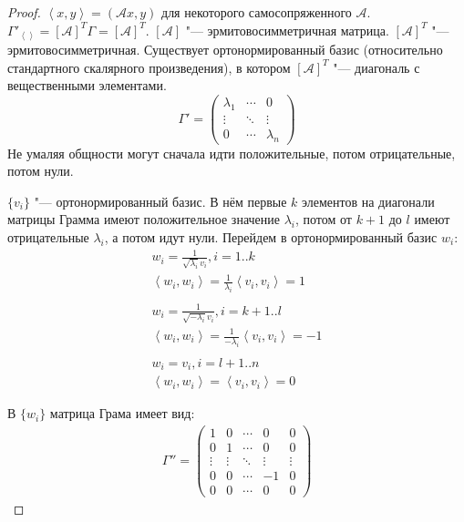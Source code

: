 \begin{proof}
	$\left<x, y\right> = (\mathcal Ax, y)$ для некоторого самосопряженного $\mathcal A$.
	$\Gamma'_{\left<\right>} = [\mathcal A]^T\Gamma = [\mathcal A]^T$.
	$[\mathcal A]$ "--- эрмитовосимметричная матрица.
	$[\mathcal A]^T$ "---эрмитовосимметричная.
	Существует ортонормированный базис (относительно стандартного скалярного произведения),
	в котором 
	$[\mathcal A]^T$ "--- диагональ с вещественными элементами.
	\[
		\Gamma' = \begin{pmatrix}
			\lambda_1 & \cdots & 0 \\
			\vdots & \ddots & \vdots \\
			0 & \cdots & \lambda_n
		\end{pmatrix}
	\]
	Не умаляя общности могут сначала идти положительные, потом отрицательные, потом нули.

	$\{v_i\}$ "--- ортонормированный базис.
	В нём первые $k$ элементов на диагонали матрицы Грамма имеют положительное значение $\lambda_i$,
	потом от $k+1$ до $l$ имеют отрицательные $\lambda_i$, а потом идут нули.
	Перейдем в ортонормированный базис $w_i$:
	\begin{gather*}
		w_i = \frac{1}{\sqrt{\lambda_i}v_i}, i = 1..k \\
		\left<w_i, w_i\right> = \frac1{\lambda_i} \left<v_i, v_i\right> = 1 \\
		\\
		w_i = \frac{1}{\sqrt{-\lambda_i}v_i}, i = k+1..l \\
		\left<w_i, w_i\right> = \frac1{-\lambda_i} \left<v_i, v_i\right> = -1 \\
		\\
		w_i = v_i, i = l+1..n \\
		\left<w_i, w_i\right> = \left<v_i, v_i \right> = 0
	\end{gather*}
	
	В $\{w_i\}$ матрица Грама имеет вид:
	\begin{gather*}
		\Gamma'' = \begin{pmatrix}
			1 & 0 &\cdots & 0 & 0 \\
			0 & 1 &\cdots & 0 & 0 \\
			\vdots&\vdots &\ddots&\vdots&\vdots\\
			0 & 0 &\cdots & -1 & 0 \\
			0 & 0 &\cdots & 0 & 0
		\end{pmatrix}
	\end{gather*}
\end{proof}

